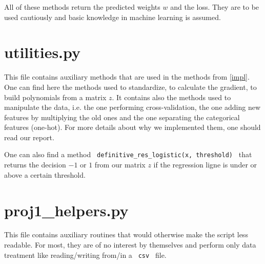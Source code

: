 \documentclass[11pt, oneside]{article}   	%
\begin{document}
All of these methods return the predicted weights $w$ and the loss. They are to be used cautiously and basic knowledge in machine learning is assumed.

\section{utilities.py}

This file contains auxiliary methods that are used in the methods from \ref{impl}. One can find here the methods used to standardize, to calculate the gradient, to build polynomials from a matrix $z$. It contains also the methods used to manipulate the data, i.e. the one performing cross-validation, the one adding new features by multiplying the old ones and the one separating the categorical features (one-hot). For more details about why we implemented them, one should read our report.

One can also find a method \lstinline" definitive_res_logistic(x, threshold) " that returns the decision $-1$ or $1$ from our matrix $z$ if the regression ligne is under or above a certain threshold.

\section{proj1\_helpers.py}

This file contains auxiliary routines that would otherwise make the script less readable. For most, they are of no interest by themselves and perform only data treatment like reading/writing from/in a \lstinline" csv " file.
\end{document}

